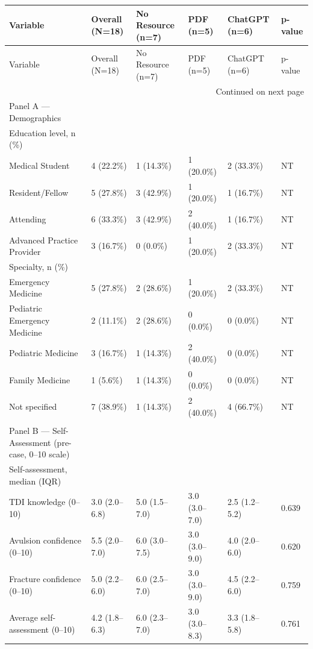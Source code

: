 \begin{longtable}{llllll}
\toprule
Variable & Overall (N=18) & No Resource (n=7) & PDF (n=5) & ChatGPT (n=6) & p-value \\
\midrule
\endfirsthead
\toprule
Variable & Overall (N=18) & No Resource (n=7) & PDF (n=5) & ChatGPT (n=6) & p-value \\
\midrule
\endhead
\midrule
\multicolumn{6}{r}{Continued on next page} \\
\midrule
\endfoot
\bottomrule
\endlastfoot
Panel A — Demographics &  &  &  &  &  \\
Education level, n (\%) &  &  &  &  &  \\
  Medical Student & 4 (22.2\%) & 1 (14.3\%) & 1 (20.0\%) & 2 (33.3\%) & NT \\
  Resident/Fellow & 5 (27.8\%) & 3 (42.9\%) & 1 (20.0\%) & 1 (16.7\%) & NT \\
  Attending & 6 (33.3\%) & 3 (42.9\%) & 2 (40.0\%) & 1 (16.7\%) & NT \\
  Advanced Practice Provider & 3 (16.7\%) & 0 (0.0\%) & 1 (20.0\%) & 2 (33.3\%) & NT \\
Specialty, n (\%) &  &  &  &  &  \\
  Emergency Medicine & 5 (27.8\%) & 2 (28.6\%) & 1 (20.0\%) & 2 (33.3\%) & NT \\
  Pediatric Emergency Medicine & 2 (11.1\%) & 2 (28.6\%) & 0 (0.0\%) & 0 (0.0\%) & NT \\
  Pediatric Medicine & 3 (16.7\%) & 1 (14.3\%) & 2 (40.0\%) & 0 (0.0\%) & NT \\
  Family Medicine & 1 (5.6\%) & 1 (14.3\%) & 0 (0.0\%) & 0 (0.0\%) & NT \\
  Not specified & 7 (38.9\%) & 1 (14.3\%) & 2 (40.0\%) & 4 (66.7\%) & NT \\
 &  &  &  &  &  \\
Panel B — Self-Assessment (pre-case, 0–10 scale) &  &  &  &  &  \\
Self-assessment, median (IQR) &  &  &  &  &  \\
  TDI knowledge (0–10) & 3.0 (2.0–6.8) & 5.0 (1.5–7.0) & 3.0 (3.0–7.0) & 2.5 (1.2–5.2) & 0.639 \\
  Avulsion confidence (0–10) & 5.5 (2.0–7.0) & 6.0 (3.0–7.5) & 3.0 (3.0–9.0) & 4.0 (2.0–6.0) & 0.620 \\
  Fracture confidence (0–10) & 5.0 (2.2–6.0) & 6.0 (2.5–7.0) & 3.0 (3.0–9.0) & 4.5 (2.2–6.0) & 0.759 \\
  Average self-assessment (0–10) & 4.2 (1.8–6.3) & 6.0 (2.3–7.0) & 3.0 (3.0–8.3) & 3.3 (1.8–5.8) & 0.761 \\

\end{longtable}

